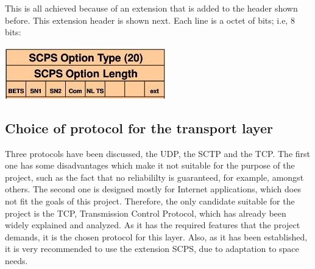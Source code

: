 This is all achieved because of an extension that is added to the header shown before. This extension header is shown next. Each line is a octet of bits; i.e, 8 bits:

\includegraphics{TCP3(extension)}


\subsection{Choice of protocol for the transport layer}
Three protocols have been discussed, the UDP, the SCTP and the TCP. The first one has some disadvantages which make it not suitable for the purpose of the project, such as the fact that no reliabililty is guaranteed, for example, amongst others. The second one is designed mostly for Internet applications, which does not fit the goals of this project. Therefore, the only candidate suitable for the project is the TCP, Transmission Control Protocol, which has already been widely explained and analyzed. As it has the required features that the project demands, it is the chosen protocol for this layer. Also, as it has been established, it is very recommended to use the extension SCPS, due to adaptation to space needs.  
